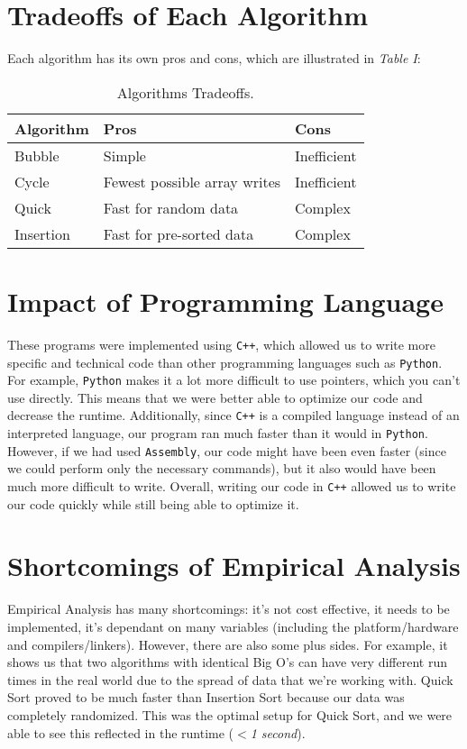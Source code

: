\documentclass[journal]{IEEEtran}
\begin{document}
\section{Tradeoffs of Each Algorithm}
Each algorithm has its own pros and cons, which are illustrated in \textit{Table I}:
\begin{table}[h!]
  \begin{center}
    \caption{Algorithms Tradeoffs.}
    \label{tab:table1}
    \begin{tabular}{l|l|l} %
      \textbf{Algorithm} & \textbf{Pros} & \textbf{Cons} \\
      \hline
      Bubble & Simple & Inefficient\\
      Cycle & Fewest possible array writes & Inefficient\\
      Quick & Fast for random data & Complex\\
      Insertion & Fast for pre-sorted data & Complex\\
    \end{tabular}
  \end{center}
\end{table} %

\section{Impact of Programming Language}
These programs were implemented using \texttt{C++}, which allowed us to write more specific and technical code than other programming languages such as \texttt{Python}. For example, \texttt{Python} makes it a lot more difficult to use pointers, which you can't use directly. This means that we were better able to optimize our code and decrease the runtime. Additionally, since \texttt{C++} is a compiled language instead of an interpreted language, our program ran much faster than it would in \texttt{Python}. However, if we had used \texttt{Assembly}, our code might have been even faster (since we could perform only the necessary commands), but it also would have been much more difficult to write. Overall, writing our code in \texttt{C++} allowed us to write our code quickly while still being able to optimize it.

\section{Shortcomings of Empirical Analysis}
Empirical Analysis has many shortcomings: it's not cost effective, it needs to be implemented, it's dependant on many variables (including the platform/hardware and compilers/linkers). However, there are also some plus sides. For example, it shows us that two algorithms with identical Big O's can have very different run times in the real world due to the spread of data that we're working with. Quick Sort proved to be much faster than Insertion Sort because our data was completely randomized. This was the optimal setup for Quick Sort, and we were able to see this reflected in the runtime ($<$\textit{1 second}).
\end{document}
